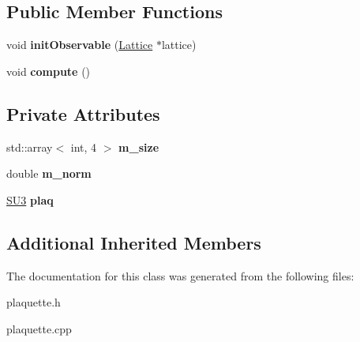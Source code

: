 \subsection*{Public Member Functions}
\begin{DoxyCompactItemize}
\item 
void {\bfseries init\+Observable} (\hyperlink{classLattice}{Lattice} $\ast$lattice)\hypertarget{classPlaquette_a736815cd93211ae6762d26f3694a88d5}{}\label{classPlaquette_a736815cd93211ae6762d26f3694a88d5}

\item 
void {\bfseries compute} ()\hypertarget{classPlaquette_a4f5cd3222dc5ecec563ff873507493ea}{}\label{classPlaquette_a4f5cd3222dc5ecec563ff873507493ea}

\end{DoxyCompactItemize}
\subsection*{Private Attributes}
\begin{DoxyCompactItemize}
\item 
std\+::array$<$ int, 4 $>$ {\bfseries m\+\_\+size}\hypertarget{classPlaquette_aef320da834a652eef5dc9fdaf9feb898}{}\label{classPlaquette_aef320da834a652eef5dc9fdaf9feb898}

\item 
double {\bfseries m\+\_\+norm}\hypertarget{classPlaquette_a01a530c15a05f0d0c0db0ee96df7f943}{}\label{classPlaquette_a01a530c15a05f0d0c0db0ee96df7f943}

\item 
\hyperlink{structSU3}{S\+U3} {\bfseries plaq}\hypertarget{classPlaquette_ada0642da7642a9d271681985b93a4070}{}\label{classPlaquette_ada0642da7642a9d271681985b93a4070}

\end{DoxyCompactItemize}
\subsection*{Additional Inherited Members}


The documentation for this class was generated from the following files\+:\begin{DoxyCompactItemize}
\item 
plaquette.\+h\item 
plaquette.\+cpp\end{DoxyCompactItemize}
